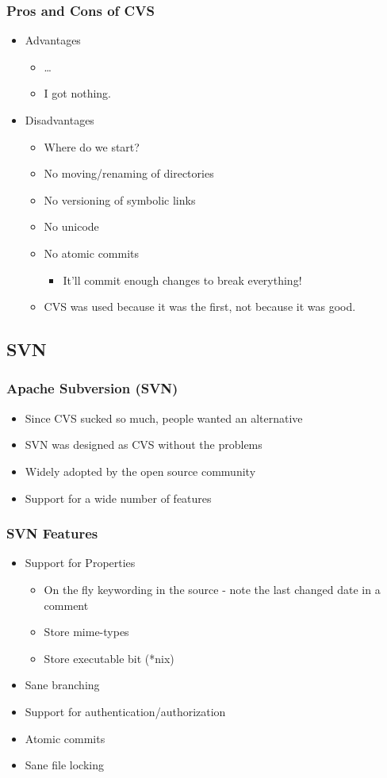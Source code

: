 \documentclass{beamer}
\begin{document}
\begin{frame}
  \frametitle{Pros and Cons of CVS}
  \begin{itemize}
    \item Advantages
      \begin{itemize}
	\item \ldots
	\item I got nothing.
      \end{itemize}
    \item Disadvantages
      \begin{itemize}
	\item Where do we start?
	\item No moving/renaming of directories
	\item No versioning of symbolic links
	\item No unicode
	\item No atomic commits 
	  \begin{itemize}
	    \item It'll commit enough changes to break everything!
	  \end{itemize}
	\item CVS was used because it was the first, not because it was good.
      \end{itemize}
  \end{itemize}
\end{frame}

\subsection{SVN}

\begin{frame}
  \frametitle{Apache Subversion (SVN)}
  \begin{itemize}
    \item Since CVS sucked so much, people wanted an alternative
    \item SVN was designed as CVS without the problems
    \item Widely adopted by the open source community
    \item Support for a wide number of features
  \end{itemize}
\end{frame}

\begin{frame}
  \frametitle{SVN Features}
  \begin{itemize}
    \item Support for Properties
      \begin{itemize}
	\item On the fly keywording in the source - note the last changed date in a comment
	\item Store mime-types
	\item Store executable bit (*nix)
      \end{itemize}
    \item Sane branching
    \item Support for authentication/authorization
    \item Atomic commits
    \item Sane file locking
  \end{itemize}
\end{frame}
\end{document}
